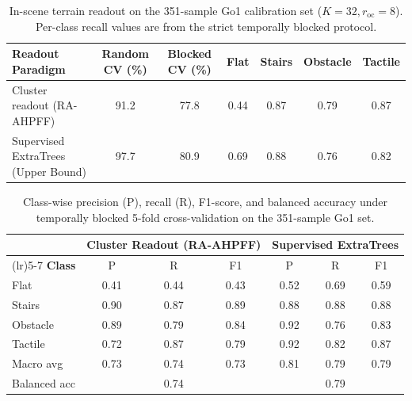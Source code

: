 \documentclass[11pt, a4paper]{article}
\begin{document}
\begin{table}[htbp]
    \centering
    \caption{In-scene terrain readout on the 351-sample Go1 calibration set ($K=32, r_{\text{oc}}=8$). Per-class recall values are from the strict temporally blocked protocol.}
    \label{tab:go1_cluster}
    \footnotesize
    \begin{tabularx}{\textwidth}{>{\raggedright\arraybackslash}X cccccc}
        \toprule
        \textbf{Readout Paradigm} & \textbf{Random CV (\%)} & \textbf{Blocked CV (\%)} & \textbf{Flat} & \textbf{Stairs} & \textbf{Obstacle} & \textbf{Tactile} \\
        \midrule
        Cluster readout (RA-AHPFF) & 91.2 & 77.8 & 0.44 & 0.87 & 0.79 & 0.87 \\
        Supervised ExtraTrees (Upper Bound) & 97.7 & 80.9 & 0.69 & 0.88 & 0.76 & 0.82 \\
        \bottomrule
    \end{tabularx}
\end{table}

\begin{table}[htbp]
    \centering
    \caption{Class-wise precision (P), recall (R), F1-score, and balanced accuracy under temporally blocked 5-fold cross-validation on the 351-sample Go1 set.}
    \label{tab:go1_classwise}
    \footnotesize
    \begin{tabularx}{\textwidth}{>{\raggedright\arraybackslash}X cccccc}
        \toprule
        & \multicolumn{3}{c}{\textbf{Cluster Readout (RA-AHPFF)}} & \multicolumn{3}{c}{\textbf{Supervised ExtraTrees}} \\
        \cmidrule(lr){2-4}\cmidrule(lr){5-7}
        \textbf{Class} & P & R & F1 & P & R & F1 \\
        \midrule
        Flat & 0.41 & 0.44 & 0.43 & 0.52 & 0.69 & 0.59 \\
        Stairs & 0.90 & 0.87 & 0.89 & 0.88 & 0.88 & 0.88 \\
        Obstacle & 0.89 & 0.79 & 0.84 & 0.92 & 0.76 & 0.83 \\
        Tactile & 0.72 & 0.87 & 0.79 & 0.92 & 0.82 & 0.87 \\
        \midrule
        Macro avg & 0.73 & 0.74 & 0.73 & 0.81 & 0.79 & 0.79 \\
        Balanced acc & \multicolumn{3}{c}{0.74} & \multicolumn{3}{c}{0.79} \\
        \bottomrule
    \end{tabularx}
\end{table}
\end{document}
